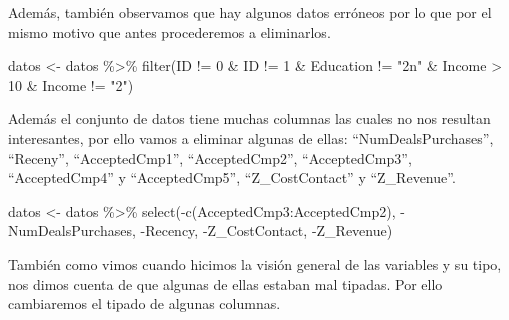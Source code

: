 \documentclass[
]{article}
\newenvironment{Shaded}{\begin{snugshade}}{\end{snugshade}}
\newcommand{\DecValTok}[1]{\textcolor[rgb]{0.00,0.00,0.81}{#1}}
\newcommand{\FunctionTok}[1]{\textcolor[rgb]{0.00,0.00,0.00}{#1}}
\newcommand{\NormalTok}[1]{#1}
\newcommand{\OtherTok}[1]{\textcolor[rgb]{0.56,0.35,0.01}{#1}}
\newcommand{\SpecialCharTok}[1]{\textcolor[rgb]{0.00,0.00,0.00}{#1}}
\newcommand{\StringTok}[1]{\textcolor[rgb]{0.31,0.60,0.02}{#1}}
\begin{document}
Además, también observamos que hay algunos datos erróneos por lo que por
el mismo motivo que antes procederemos a eliminarlos.

\begin{Shaded}
\begin{Highlighting}[]
\NormalTok{datos }\OtherTok{\textless{}{-}}\NormalTok{ datos }\SpecialCharTok{\%\textgreater{}\%}
  \FunctionTok{filter}\NormalTok{(ID }\SpecialCharTok{!=} \DecValTok{0} \SpecialCharTok{\&}\NormalTok{ ID }\SpecialCharTok{!=} \DecValTok{1} \SpecialCharTok{\&}\NormalTok{ Education }\SpecialCharTok{!=} \StringTok{"2n"} \SpecialCharTok{\&}\NormalTok{ Income }\SpecialCharTok{\textgreater{}} \DecValTok{10} \SpecialCharTok{\&}\NormalTok{ Income }\SpecialCharTok{!=} \StringTok{"2"}\NormalTok{)}
\end{Highlighting}
\end{Shaded}

Además el conjunto de datos tiene muchas columnas las cuales no nos
resultan interesantes, por ello vamos a eliminar algunas de ellas:
``NumDealsPurchases'', ``Receny'', ``AcceptedCmp1'', ``AcceptedCmp2'',
``AcceptedCmp3'', ``AcceptedCmp4'' y ``AcceptedCmp5'',
``Z\_CostContact'' y ``Z\_Revenue''.

\begin{Shaded}
\begin{Highlighting}[]
\NormalTok{datos }\OtherTok{\textless{}{-}}\NormalTok{ datos }\SpecialCharTok{\%\textgreater{}\%}
  \FunctionTok{select}\NormalTok{(}\SpecialCharTok{{-}}\FunctionTok{c}\NormalTok{(AcceptedCmp3}\SpecialCharTok{:}\NormalTok{AcceptedCmp2), }\SpecialCharTok{{-}}\NormalTok{NumDealsPurchases, }\SpecialCharTok{{-}}\NormalTok{Recency, }
         \SpecialCharTok{{-}}\NormalTok{Z\_CostContact, }\SpecialCharTok{{-}}\NormalTok{Z\_Revenue)}
\end{Highlighting}
\end{Shaded}

También como vimos cuando hicimos la visión general de las variables y
su tipo, nos dimos cuenta de que algunas de ellas estaban mal tipadas.
Por ello cambiaremos el tipado de algunas columnas.

\begin{Shaded}
\end{Shaded}
\end{document}
